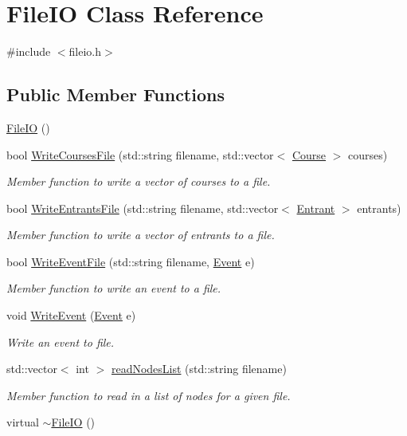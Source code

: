 \hypertarget{classFileIO}{\section{\-File\-I\-O \-Class \-Reference}
\label{classFileIO}
}


{\ttfamily \#include $<$fileio.\-h$>$}

\subsection*{\-Public \-Member \-Functions}
\begin{DoxyCompactItemize}
\item 
\hyperlink{classFileIO_a8b0d602c3461181e12c05f655dea5018}{\-File\-I\-O} ()
\item 
bool \hyperlink{classFileIO_ae08f875719305997f40dd2971feae32d}{\-Write\-Courses\-File} (std\-::string filename, std\-::vector$<$ \hyperlink{classCourse}{\-Course} $>$ courses)
\begin{DoxyCompactList}\small\item\em \-Member function to write a vector of courses to a file. \end{DoxyCompactList}\item 
bool \hyperlink{classFileIO_a6ae3512e650f4bdf7413d99856f36722}{\-Write\-Entrants\-File} (std\-::string filename, std\-::vector$<$ \hyperlink{classEntrant}{\-Entrant} $>$ entrants)
\begin{DoxyCompactList}\small\item\em \-Member function to write a vector of entrants to a file. \end{DoxyCompactList}\item 
bool \hyperlink{classFileIO_ac97971c675d1398f98fd9c0ffbb3b278}{\-Write\-Event\-File} (std\-::string filename, \hyperlink{classEvent}{\-Event} e)
\begin{DoxyCompactList}\small\item\em \-Member function to write an event to a file. \end{DoxyCompactList}\item 
void \hyperlink{classFileIO_a5dd25c0348cbb2de0a8b5ad8849362ab}{\-Write\-Event} (\hyperlink{classEvent}{\-Event} e)
\begin{DoxyCompactList}\small\item\em \-Write an event to file. \end{DoxyCompactList}\item 
std\-::vector$<$ int $>$ \hyperlink{classFileIO_a2307b9dbc55e0385337544c856ee16eb}{read\-Nodes\-List} (std\-::string filename)
\begin{DoxyCompactList}\small\item\em \-Member function to read in a list of nodes for a given file. \end{DoxyCompactList}\item 
virtual \hyperlink{classFileIO_adc3caa8f1e5d76274d8ffb8b5c17288b}{$\sim$\-File\-I\-O} ()
\end{DoxyCompactItemize}


